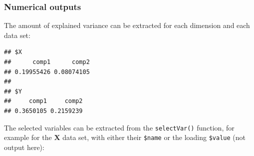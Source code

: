 \documentclass[]{book}
\newenvironment{Shaded}{\begin{snugshade}}{\end{snugshade}}
\newcommand{\CommentTok}[1]{\textcolor[rgb]{0.56,0.35,0.01}{\textit{#1}}}
\newcommand{\DataTypeTok}[1]{\textcolor[rgb]{0.13,0.29,0.53}{#1}}
\newcommand{\DecValTok}[1]{\textcolor[rgb]{0.00,0.00,0.81}{#1}}
\newcommand{\KeywordTok}[1]{\textcolor[rgb]{0.13,0.29,0.53}{\textbf{#1}}}
\newcommand{\NormalTok}[1]{#1}
\newcommand{\OperatorTok}[1]{\textcolor[rgb]{0.81,0.36,0.00}{\textbf{#1}}}
\newcommand{\StringTok}[1]{\textcolor[rgb]{0.31,0.60,0.02}{#1}}
\begin{document}
\begin{Shaded}
\end{Shaded}

\hypertarget{pls:result:num}{%
\subsubsection{Numerical outputs}\label{pls:result:num}}

The amount of explained variance can be extracted for each dimension and each data set:

\begin{Shaded}
\end{Shaded}

\begin{verbatim}
## $X
##      comp1      comp2 
## 0.19955426 0.08074105 
## 
## $Y
##     comp1     comp2 
## 0.3650105 0.2159239
\end{verbatim}

The selected variables can be extracted from the \texttt{selectVar()} function, for example for the \(\boldsymbol X\) data set, with either their \texttt{\$name} or the loading \texttt{\$value} (not output here):

\begin{Shaded}
\end{Shaded}
\end{document}
